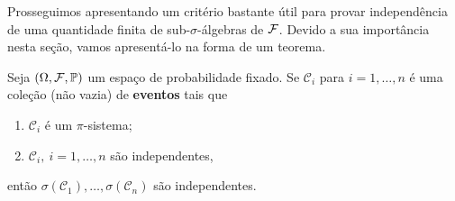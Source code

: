 Prosseguimos apresentando um critério bastante útil
para provar independência de uma 
quantidade finita de sub-$\sigma$-álgebras de $\mathcal{F}$.
Devido a sua importância nesta seção, vamos apresentá-lo
na forma de um teorema.

\begin{teorema}
Seja $(\Omega,\mathcal{F},\mathbb{P})$ um espaço de probabilidade fixado.
Se $\mathcal{C}_i$ para $i=1,\ldots,n$ é uma 
coleção (não vazia) de {\bf eventos} tais que 
	\begin{enumerate}
		\item $\mathcal{C}_i	$ é um $\pi$-sistema;
		\item $\mathcal{C}_i,\ i=1,\ldots, n$ são independentes,
	\end{enumerate}	 	
então $\sigma(\mathcal{C}_1),\ldots, \sigma(\mathcal{C}_n)$ são 
independentes.
\end{teorema}




